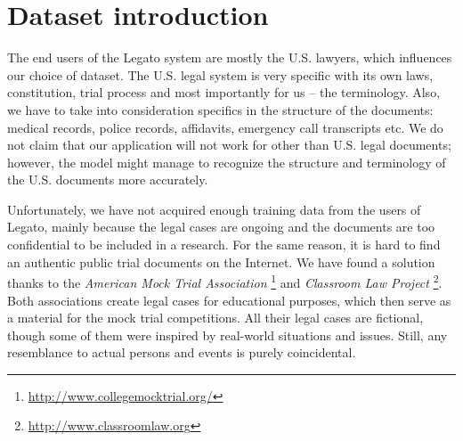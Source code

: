 \documentclass[
  digital, %
  notable,   %
  nolof,     %
  nolot,     %
  draft
]{fithesis3}
\begin{document}
\section{Dataset introduction}
The end users of the Legato system are mostly the U.S. lawyers, which influences our choice of dataset.
The U.S. legal system is very specific with its own laws, constitution, trial process and most importantly for us -- the terminology.
Also, we have to take into consideration specifics in the structure of the documents: medical records, police records, affidavits, emergency call transcripts etc.
We do not claim that our application will not work for other than U.S. legal documents; however, the model might manage to recognize the structure and terminology of the U.S. documents more accurately.

Unfortunately, we have not acquired enough training data from the users of Legato, mainly because the legal cases are ongoing and the documents are too confidential to be included in a research.
For the same reason, it is hard to find an authentic public trial documents on the Internet.
We have found a solution thanks to the \textit{American Mock Trial Association} \footnote{\url{http://www.collegemocktrial.org/}} and \textit{Classroom Law Project} \footnote{\url{http://www.classroomlaw.org}}.
Both associations create legal cases for educational purposes, which then serve as a material for the mock trial competitions.
All their legal cases are fictional, though some of them were inspired by real-world situations and issues.
Still, any resemblance to actual persons and events is purely coincidental.
\end{document}
